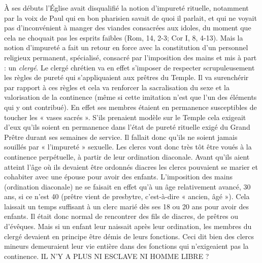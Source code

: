  À ses débuts l'Église avait disqualifié la notion d'impureté rituelle, notamment par la voix de Paul qui en bon pharisien savait de quoi il parlait, et qui ne voyait pas d'inconvénient à manger des viandes consacrées aux idoles, du moment que cela ne choquait pas les esprits faibles (Rom, 14, 2-3; Cor I, 8, 4-13). Mais la notion d'impureté a fait un retour en force avec la constitution d'un personnel religieux permanent, spécialisé, consacré par l'imposition des mains et mis à part : un \emph{clergé}. Le clergé chrétien va en effet s'imposer de respecter scrupuleusement les règles de pureté qui s'appliquaient aux prêtres du Temple. Il va surenchérir par rapport à ces règles et cela va renforcer la sacralisation du sexe et la valorisation de la continence (même si cette imitation n'est que l'un des éléments qui y ont contribué). En effet ses membres étaient en permanence susceptibles de toucher les « vases sacrés ». S'ils prenaient modèle sur le Temple cela exigeait d'eux qu'ils soient en permanence dans l'état de pureté rituelle exigé du Grand Prêtre durant ses semaines de service. Il fallait donc qu'ils ne soient jamais souillés par « l'impureté » sexuelle. Les clercs vont donc très tôt être voués à la continence perpétuelle, à partir de leur ordination diaconale. 
 Avant qu'ils aient atteint l'âge où ils devaient être ordonnés diacres les clercs pouvaient se marier et cohabiter avec une épouse pour avoir des enfants. L'imposition des mains (ordination diaconale) ne se faisait en effet qu'à un âge relativement avancé, 30 ans, si ce n'est 40 (prêtre vient de presbytre, c'est-à-dire « ancien, âgé »). Cela laissait un temps suffisant à un clerc marié dès ses 18 ou 20 ans pour avoir des enfants. Il était donc normal de rencontrer des fils de diacres, de prêtres ou d'évêques. Mais si un enfant leur naissait après leur ordination, les membres du clergé devaient en principe être démis de leurs fonctions. Ceci dit bien des clercs mineurs demeuraient leur vie entière dans des fonctions qui n'exigeaient pas la continence. 
IL N'Y A PLUS NI ESCLAVE NI HOMME LIBRE ?
